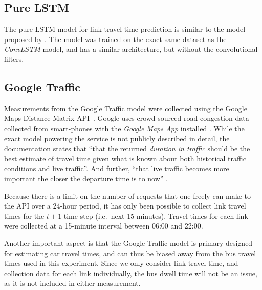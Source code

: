 \documentclass[preprint,11pt,5p,twocolumn]{elsarticle}
\begin{document}
\subsection{Pure LSTM}
The pure LSTM-model for link travel time prediction is similar to the model proposed by \citet{YanjieDuan2016}. The model was trained on the exact same dataset as the \emph{ConvLSTM} model, and has a similar architecture, but without the convolutional filters.

\subsection{Google Traffic}
Measurements from the Google Traffic model were collected using the Google Maps Distance Matrix API~\citep{GMaps_DistanceMatrixAPI}. Google uses crowd-sourced road congestion data collected from smart-phones with the \emph{Google Maps App} installed \citep{GMaps_Crowdsourcing}. While the exact model powering the service is not publicly described in detail, the documentation states that ``that the returned \emph{duration in traffic} should be the best estimate of travel time given what is known about both historical traffic conditions and live traffic''. And further, ``that live traffic becomes more important the closer the departure time is to now'' \citep{GMaps_DistanceMatrixAPI}.

Because there is a limit on the number of requests that one freely can make to the API over a 24-hour period, it has only been possible to collect link travel times for the $t + 1$ time step (i.e.\ next 15 minutes). Travel times for each link were collected at a 15-minute interval between 06:00 and 22:00.

Another important aspect is that the Google Traffic model is primary designed for estimating car travel times, and can thus be biased away from the bus travel times used in this experiment. Since we only consider link travel time, and collection data for each link individually, the bus dwell time will not be an issue, as it is not included in either measurement.
\end{document}

